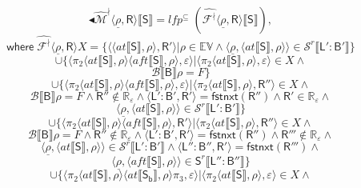 $$\blacktriangleleft\mathcal{\hat{M}^\nmid} \langle \underline{\rho}, \mathsf{R} \rangle \llbracket \mathsf{S} \rrbracket = lfp^\subseteq \; (\mathcal{\hat{F^\nmid}} \langle \underline{\rho}, \mathsf{R} \rangle \llbracket \mathsf{S} \rrbracket),$$
$$\mathsf{where} \;  \mathcal{\hat{F^\nmid}} \langle \underline{\rho}, \mathsf{R} \rangle X = \{ \langle \langle at \llbracket \mathsf{S} \rrbracket , \rho \rangle , \mathsf{R'} \rangle | \rho \in \mathbb{EV} \land \langle \underline{\rho}, \langle at \llbracket \mathsf{S} \rrbracket , \rho \rangle \rangle \in \mathcal{S}^r \llbracket \mathsf{L':B'} \rrbracket \}$$
$$\cup \{\langle \pi_2 \langle at \llbracket \mathsf{S} \rrbracket , \rho \rangle \langle aft \llbracket \mathsf{S}\rrbracket , \rho \rangle , \varepsilon \rangle | \langle \pi_2 \langle at \llbracket \mathsf{S} \rrbracket , \rho \rangle , \varepsilon \rangle \in X \land$$
$$\mathcal{B}\llbracket \mathsf{B} \rrbracket \rho = \mathit{F} \}$$
$$\cup \{ \langle \pi_2 \langle at \llbracket \mathsf{S} \rrbracket , \rho \rangle \langle aft \llbracket \mathsf{S} \rrbracket , \rho \rangle , \varepsilon \rangle | \langle \pi_2 \langle at \llbracket \mathsf{S} \rrbracket , \rho \rangle , \mathsf{R''} \rangle \in X \land $$
$$\mathcal{B}\llbracket \mathsf{B} \rrbracket \rho = \mathit{F} \land \mathsf{R''} \notin \mathbb{R_\varepsilon} \land \langle \mathsf{L':B',R'} \rangle = \mathsf{fstnxt(R'')} \land \mathsf{R'} \in \mathbb{R_\varepsilon} \land$$
$$\langle \underline{\rho} ,\langle at \llbracket \mathsf{S} \rrbracket , \rho \rangle \rangle \in \mathcal{S}^r \llbracket \mathsf{L':B'} \rrbracket\}$$
$$\cup \{\langle \pi_2 \langle at \llbracket \mathsf{S} \rrbracket , \rho \rangle \langle aft \llbracket \mathsf{S}\rrbracket , \rho \rangle , \mathsf{R'} \rangle | \langle \pi_2 \langle at \llbracket \mathsf{S} \rrbracket , \rho \rangle , \mathsf{R''} \rangle \in X \land$$
$$\mathcal{B}\llbracket \mathsf{B} \rrbracket \rho = \mathit{F} \land \mathsf{R''} \notin \mathbb{R_\varepsilon} \land \langle \mathsf{L':B',R'} \rangle = \mathsf{fstnxt(R'')} \land \mathsf{R'''} \notin \mathbb{R_\varepsilon} \land$$
$$\langle \underline{\rho}, \langle at \llbracket \mathsf{S} \rrbracket , \rho \rangle \rangle \in \mathcal{S}^r \llbracket \mathsf{L':B'} \rrbracket \land \langle \mathsf{L'':B'' , R'} \rangle = \mathsf{fstnxt(R''')} \land$$
$$\langle \underline{\rho}, \langle aft \llbracket \mathsf{S} \rrbracket , \rho \rangle \rangle \in \mathsf{S}^r \llbracket \mathsf{L'':B''} \rrbracket \}$$
$$\cup \{\langle \pi_2 \langle at \llbracket \mathsf{S} \rrbracket , \rho \rangle \langle at \llbracket \mathsf{S_b} \rrbracket , \rho \rangle \pi_3, \varepsilon \rangle | \langle \pi_2 \langle at \llbracket \mathsf{S} \rrbracket , \rho \rangle , \varepsilon \rangle \in X \land$$
